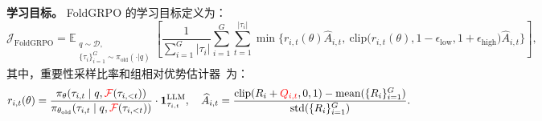 \textbf{学习目标。}
FoldGRPO 的学习目标定义为：
{\small
\begin{equation}
\mathcal{J}_{\text{FoldGRPO}} = \mathbb{E}_{\substack{q\sim \mathcal{D},\\ \{\tau_i\}_{i=1}^{G}\sim \pi_{\text{old}}(\cdot|q)} }
\left[
\frac{1}{\sum_{i=1}^{G} |{\tau}_i|}
\sum_{i=1}^{G} \sum_{t=1}^{|{\tau}_i|}
\min\Big\{
r_{i,t}(\theta) \widehat{A}_{i,t},
\ \mathrm{clip}\big(r_{i,t}(\theta), 1-\epsilon_{\text{low}}, 1+\epsilon_{\text{high}}\big)\widehat{A}_{i,t}
\Big\}
\right],
\end{equation}
}
其中，重要性采样比率和组相对优势估计器~\citep{shao2024deepseekmath}为：
\begin{equation}
r_{i,t}(\theta) =
\frac{\pi_{\theta}({\tau}_{i,t}\mid q, \mathcal{\textcolor{red}{F}}({\tau}_{i, <t}))}
     {\pi_{\theta_{\text{old}}}({\tau}_{i,t}\mid q, \mathcal{\textcolor{red}{F}}({\tau}_{i, <t}))}\cdot
     \mathbf{1}_{\tau_{i,t}}^{\mathrm{LLM}},
\quad
\widehat{A}_{i,t} =
\frac{\mathrm{clip}(R_i + \textcolor{red}{Q_{i, t}}, 0, 1) - \mathrm{mean}(\{R_i\}_{i=1}^{G})}
     {\mathrm{std}(\{R_i\}_{i=1}^{G})}.
\end{equation}
